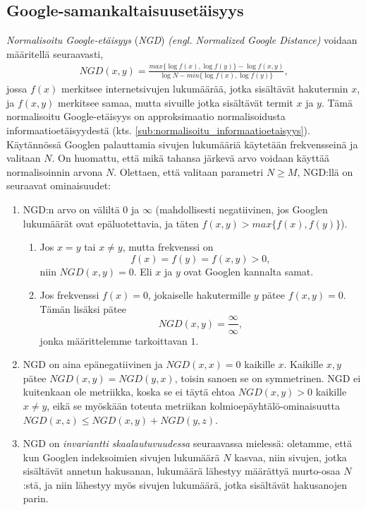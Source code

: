 \documentclass[12pt,finnish]{tktltiki2}
\theoremstyle{definition}
\theoremstyle{remark}
\newcommand{\engl}[1]{\emph{(engl. #1)}}
\begin{document}
    \subsection{Google-samankaltaisuusetäisyys} %
    \label{sub:google_samankaltaisuusetaisyys}
      \emph{Normalisoitu Google-etäisyys} (\emph{NGD}) \engl{Normalized Google Distance}  voidaan määritellä seuraavasti,
      \begin{align}
        NGD(x,y) = \frac{max\{\log{f(x)},\log{f(y)}\}-\log{f(x,y)}}{\log{N}-min\{\log{f(x)},\log{f(y)}\}},
      \end{align}
      jossa $f(x)$ merkitsee internetsivujen lukumäärää, jotka sisältävät hakutermin $x$, ja $f(x,y)$ merkitsee samaa, mutta sivuille jotka sisältävät termit $x$ ja $y$.
      Tämä normalisoitu Google-etäisyys on approksimaatio normalisoidusta informaatioetäisyydestä (kts. \ref{sub:normalisoitu_informaatioetaisyys}).
      Käytännössä Googlen palauttamia sivujen lukumääriä käytetään frekvensseinä ja valitaan $N$.
      On huomattu, että mikä tahansa järkevä arvo voidaan käyttää normalisoinnin arvona $N$.
     Olettaen, että valitaan parametri $N\geq{}M$, NGD:llä on seuraavat ominaisuudet:
      \begin{enumerate}
        \item NGD:n arvo on väliltä $0$ ja $\infty$ (mahdollisesti negatiivinen, jos Googlen lukumäärät ovat epäluotettavia, ja täten $f(x,y) > max\{f(x),f(y)\}$).
        \begin{enumerate}
          \item Jos $x=y$ tai $x\neq{}y$, mutta frekvenssi on
          \[
            f(x) = f(y) = f(x,y) > 0,
          \]
          niin $NGD(x,y)=0$. Eli $x$ ja $y$ ovat Googlen kannalta samat.
          \item Jos frekvenssi $f(x)=0$, jokaiselle hakutermille $y$ pätee $f(x,y)=0$. Tämän lisäksi pätee
          \[
            NGD(x,y)=\frac{\infty}{\infty},
          \]
          jonka määrittelemme tarkoittavan $1$.
        \end{enumerate}
        \item NGD on aina epänegatiivinen ja $NGD(x,x)=0$ kaikille $x$. Kaikille $x,y$ pätee $NGD(x,y)=NGD(y,x)$, toisin sanoen se on symmetrinen. NGD ei kuitenkaan ole metriikka, koska se ei täytä ehtoa $NGD(x,y) > 0$ kaikille $x\neq{}y$, eikä se myöskään toteuta metriikan kolmioepäyhtälö-ominaisuutta $NGD(x,z) \leq NGD(x,y) + NGD(y,z)$. \cite{cilibrasi2007google}
        \item NGD on \emph{invariantti skaalautuvuudessa} seuraavassa mielessä: oletamme, että kun Googlen indeksoimien sivujen lukumäärä $N$ kasvaa, niin sivujen, jotka sisältävät annetun hakusanan, lukumäärä lähestyy määrättyä murto-osaa $N$:stä, ja niin lähestyy myös sivujen lukumäärä, jotka sisältävät hakusanojen parin.
      \end{enumerate}
\end{document}

